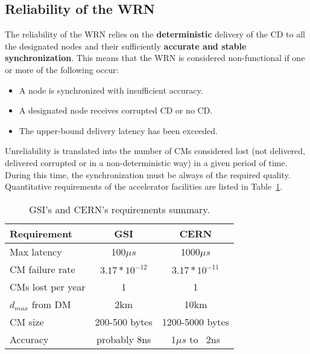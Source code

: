 \subsection{Reliability of the WRN}

The reliability of the WRN relies on the {\bf deterministic} delivery of the CD 
to all the designated nodes and their sufficiently {\bf accurate and stable synchronization}.  
This means that the WRN is considered non-functional if one or more of the following occur:
\begin{itemize}
  \item A node is synchronized with insufficient accuracy.
  \item A designated node receives corrupted CD or no CD.
  \item The upper-bound delivery latency has been exceeded.
\end{itemize}
Unreliability is translated into the number of CMs considered lost (not delivered, delivered 
corrupted or in a non-deterministic way) in a given period of time. During this time,  
the synchronization must be always of the required quality. 
Quantitative requirements of the accelerator facilities are listed in Table~\ref{tab:requirements}.

\begin{table}[ht]
\caption{GSI's and CERN's requirements summary.} 
\centering
	\begin{tabular}{| l | c | c |}                        \hline
\rowcolor{gray!35}{}
\textbf{Requirement}     & {\bf GSI}        & {\bf CERN}          \\ \hline
Max latency    		 & 100$\mu s$       & 1000$\mu s$         \\ \hline
CM failure rate          & $3.17*10^{-12}$  & $3.17*10^{-11}$     \\ \hline
CMs lost per year        & 1                & 1                   \\ \hline
$d_{max}$ from DM        & 2km              & 10km                \\ \hline
CM size 		 & 200-500 bytes    & 1200-5000 bytes     \\ \hline
Accuracy	  	 & probably 8ns     & 1$\mu s$ to  ~2ns   \\
\hline

\end{tabular}
\label{tab:requirements}
\end{table}
